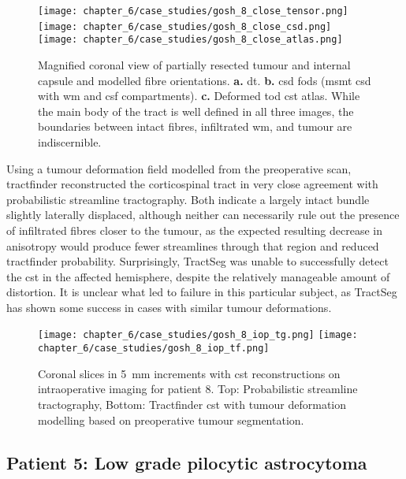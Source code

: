 \begin{figure}
  \centering
  \texttt{[image: chapter\_6/case\_studies/gosh\_8\_close\_tensor.png]}\,%
  \texttt{[image: chapter\_6/case\_studies/gosh\_8\_close\_csd.png]}\,%
  \texttt{[image: chapter\_6/case\_studies/gosh\_8\_close\_atlas.png]}
  \caption{Magnified coronal view of partially resected tumour and internal capsule and modelled fibre orientations. \textbf{a.} \gls{dt}. \textbf{b.} \gls{csd} \glspl{fod} (\gls{msmt} \gls{csd} with \gls{wm} and \gls{csf} compartments). \textbf{c.} Deformed \gls{tod} \gls{cst} atlas. While the main body of the tract is well defined in all three images, the boundaries between intact fibres, infiltrated \gls{wm}, and tumour are indiscernible.}
  \label{fig:8i_fod}
\end{figure}

Using a tumour deformation field modelled from the preoperative scan, tractfinder reconstructed the corticospinal tract in very close agreement with probabilistic streamline tractography.
Both indicate a largely intact bundle slightly laterally displaced, although neither can necessarily rule out the presence of infiltrated fibres closer to the tumour, as the expected resulting decrease in anisotropy would produce fewer streamlines through that region and reduced tractfinder probability.
Surprisingly, TractSeg was unable to successfully detect the \gls{cst} in the affected hemisphere, despite the relatively manageable amount of distortion.
It is unclear what led to failure in this particular subject, as TractSeg has shown some success in cases with similar tumour deformations\autocite{Moshe2022}.

\begin{figure}
  \texttt{[image: chapter\_6/case\_studies/gosh\_8\_iop\_tg.png]}
  \texttt{[image: chapter\_6/case\_studies/gosh\_8\_iop\_tf.png]}
  \caption{Coronal slices in 5~mm increments with \gls{cst} reconstructions on intraoperative imaging for patient 8. Top: Probabilistic streamline tractography, Bottom: Tractfinder \gls{cst} with tumour deformation modelling based on preoperative tumour segmentation.}
  \label{fig:8i_tf}
\end{figure}

\subsection{Patient 5: Low grade pilocytic astrocytoma}

